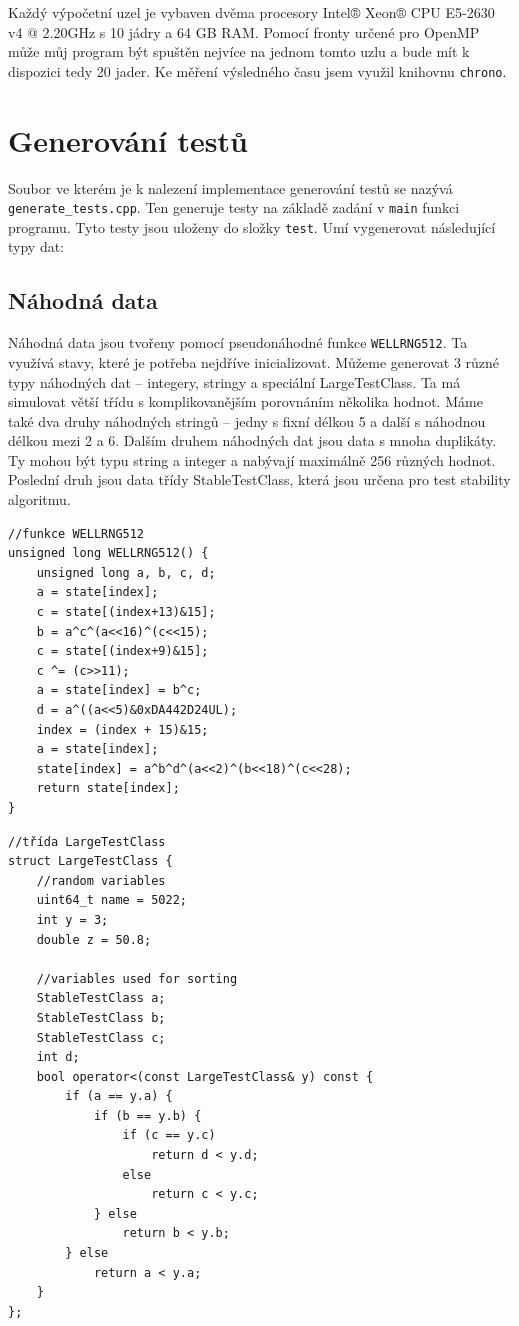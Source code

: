 \documentclass[thesis=B,czech]{FITthesis}[2019/12/23]
\begin{document}
Každý výpočetní uzel je vybaven dvěma procesory Intel® Xeon® CPU E5-2630 v4 @ 2.20GHz s 10 jádry a 64 GB RAM.\cite{starklastr} Pomocí fronty určené pro OpenMP může můj program být spuštěn nejvíce na jednom tomto uzlu a bude mít k dispozici tedy 20 jader. Ke měření výsledného času jsem využil knihovnu \texttt{chrono}.\cite{chrono}


\section{Generování testů}
Soubor ve kterém je k nalezení implementace generování testů se nazývá \texttt{generate\_tests.cpp}. Ten generuje testy na základě zadání v \texttt{main} funkci programu. Tyto testy jsou uloženy do složky \texttt{test}. Umí vygenerovat následující typy dat:

\subsection{Náhodná data}
Náhodná data jsou tvořeny pomocí pseudonáhodné funkce \texttt{WELLRNG512}\cite{wellrng}. Ta využívá stavy, které je potřeba nejdříve inicializovat. Můžeme generovat 3 různé typy náhodných dat -- integery, stringy a speciální LargeTestClass. Ta má simulovat větší třídu s komplikovanějším porovnáním několika hodnot. Máme také dva druhy náhodných stringů -- jedny s fixní délkou 5 a další s náhodnou délkou mezi 2 a 6. Dalším druhem náhodných dat jsou data s mnoha duplikáty. Ty mohou být typu string a integer a nabývají maximálně 256 různých hodnot. Poslední druh jsou data třídy StableTestClass, která jsou určena pro test stability algoritmu.

\begin{verbatim}
//funkce WELLRNG512
unsigned long WELLRNG512() {
    unsigned long a, b, c, d;
    a = state[index];
    c = state[(index+13)&15];
    b = a^c^(a<<16)^(c<<15);
    c = state[(index+9)&15];
    c ^= (c>>11);
    a = state[index] = b^c;
    d = a^((a<<5)&0xDA442D24UL);
    index = (index + 15)&15;
    a = state[index];
    state[index] = a^b^d^(a<<2)^(b<<18)^(c<<28);
    return state[index];
}
\end{verbatim}

\begin{verbatim}
//třída LargeTestClass
struct LargeTestClass {
    //random variables
    uint64_t name = 5022;
    int y = 3;
    double z = 50.8;
    
    //variables used for sorting
    StableTestClass a;
    StableTestClass b;
    StableTestClass c;
    int d;
    bool operator<(const LargeTestClass& y) const {
        if (a == y.a) {
            if (b == y.b) {
                if (c == y.c)
                    return d < y.d;
                else
                    return c < y.c;
            } else
                return b < y.b;
        } else
            return a < y.a;
    }
};
\end{verbatim}
\end{document}
